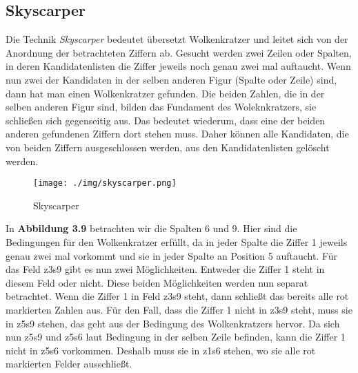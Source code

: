 \subsection{Skyscarper}
Die Technik \textit{Skyscarper} bedeutet übersetzt Wolkenkratzer und leitet sich von der Anordnung der betrachteten Ziffern ab. Gesucht werden zwei Zeilen oder Spalten, in deren Kandidatenlisten die Ziffer jeweils noch genau zwei mal auftaucht. Wenn nun zwei der Kandidaten in der selben anderen Figur (Spalte oder Zeile) sind, dann hat man einen Wolkenkratzer gefunden. Die beiden Zahlen, die in der selben anderen Figur sind, bilden das Fundament des Woleknkratzers, sie schließen sich gegenseitig aus. Das bedeutet wiederum, dass eine der beiden anderen gefundenen Ziffern dort stehen muss. Daher können alle Kandidaten, die von beiden Ziffern ausgeschlossen werden, aus den Kandidatenlisten gelöscht werden.	

\begin{figure}[h]
\begin{center}
\texttt{[image: ./img/skyscarper.png]}
\caption{Skyscarper}
\end{center}
\end{figure}

In \textbf{Abbildung 3.9} betrachten wir die Spalten 6 und 9. Hier sind die Bedingungen für den Wolkenkratzer erfüllt, da in jeder Spalte die Ziffer 1 jeweils genau zwei mal vorkommt und sie in jeder Spalte an Position 5 auftaucht. Für das Feld z3s9 gibt es nun zwei Möglichkeiten. Entweder die Ziffer 1 steht in diesem Feld oder nicht. Diese beiden Möglichkeiten werden nun separat betrachtet. Wenn die Ziffer 1 in Feld z3s9 steht, dann schließt das bereits alle rot markierten Zahlen aus. Für den Fall, dass die Ziffer 1 nicht in z3s9 steht, muss sie in z5s9 stehen, das geht aus der Bedingung des Wolkenkratzers hervor. Da sich nun z5s9 und z5s6 laut Bedingung in der selben Zeile befinden, kann die Ziffer 1 nicht in z5s6 vorkommen. Deshalb muss sie in z1s6 stehen, wo sie alle rot markierten Felder ausschließt.